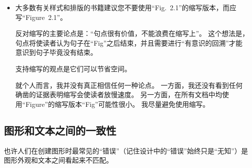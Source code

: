 \begin{itemize}

    \item 大多数有关样式和排版的书籍建议您不要使用``Fig.~2.1''的缩写版本，而应写``Figure~2.1''。
    
    反对缩写的主要论点是：``句点很有价值，不能浪费在缩写上''。 这个想法是，句点将使读者认为句子在``Fig''之后结束，并且需要进行``有意识的回溯''才能意识到句子毕竟没有结束。

    支持缩写的观点是它们可以节省空间。

    就个人而言，我并没有真正相信任何一种论点。 一方面，我还没有看到任何确凿的证据表明缩写会使读者放慢速度。 另一方面，在所有文档中均使用``Figure''的缩写版本``Fig''可能性很小。 我尽量避免使用缩写。

\end{itemize}


\subsection{图形和文本之间的一致性}


也许人们在创建图形时最常见的``错误''（记住设计中的``错误''始终只是``无知''）是图形外观和文本之间看起来不匹配。


